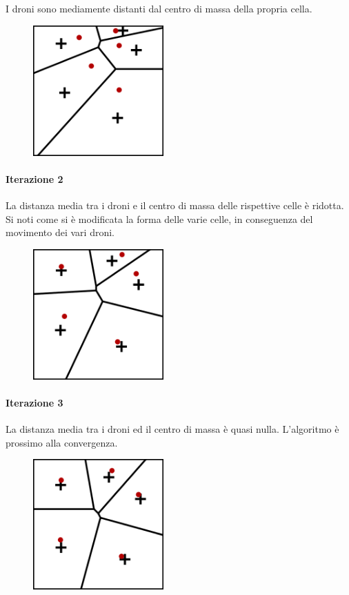 \documentclass[11pt,a4paper]{report}
\begin{document}
I droni sono mediamente distanti dal centro di massa della propria cella.

\begin{figure}[H]
\includegraphics[width=5cm]{lloyd_iterazione_1.png}
\centering
\end{figure}

\paragraph{Iterazione 2}

La distanza media tra i droni e il centro di massa delle rispettive celle è ridotta. Si noti come si è modificata la forma delle varie celle, in conseguenza del movimento dei vari droni.

\begin{figure}[H]
\includegraphics[width=5cm]{lloyd_iterazione_2.png}
\centering
\end{figure}

\paragraph{Iterazione 3}

La distanza media tra i droni ed il centro di massa è quasi nulla. L'algoritmo è prossimo alla convergenza.

\begin{figure}[H]
\includegraphics[width=5cm]{lloyd_iterazione_3.png}
\centering
\end{figure}
\end{document}
